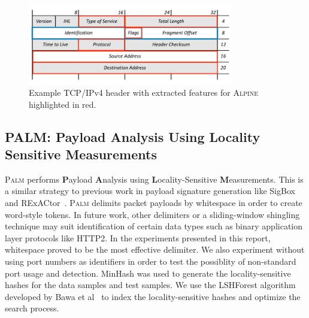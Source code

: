 \begin{figure} [ht!]
  \centering
  \includegraphics[width=0.8\textwidth]{chapters/4/img/alpineheader.png}
  \caption{Example TCP/IPv4 header with extracted features for \textsc{Alpine} highlighted in red.}
  \label{fig:alpineheader}
\end{figure}

\subsection{PALM: Payload Analysis Using Locality Sensitive Measurements}
\textsc{Palm} performs \textbf{P}ayload \textbf{A}nalysis using \textbf{L}ocality-Sensitive \textbf{M}easurements. This is a similar strategy to previous work in payload signature generation like SigBox~\cite{sigbox} and RExACtor~\cite{rexactor}. \textsc{Palm} delimits packet payloads by whitespace in order to create word-style tokens. In future work, other delimiters or a sliding-window shingling technique may suit identification of certain data types such as binary application layer protocols like HTTP2. In the experiments presented in this report, whitespace proved to be the most effective delimiter. We also experiment without using port numbers as identifiers in order to test the possiblity of non-standard port usage and detection. MinHash was used to generate the locality-sensitive hashes for the data samples and test samples. We use the LSHForest algorithm developed by Bawa et al~\cite{lshforest} to index the locality-sensitive hashes and optimize the search process.
